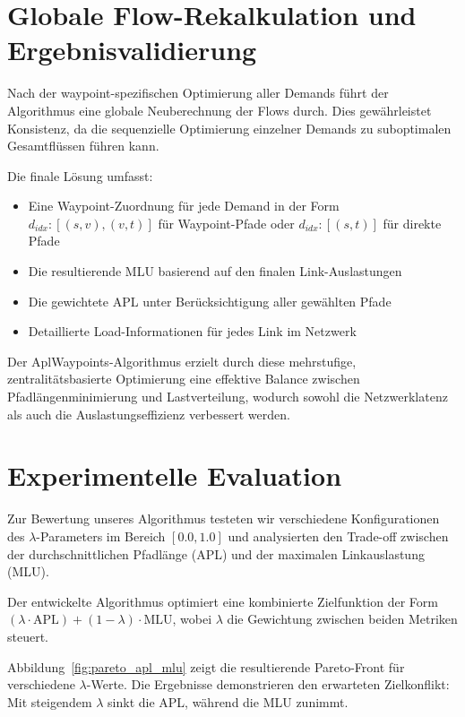 \section{Globale Flow-Rekalkulation und Ergebnisvalidierung}

Nach der waypoint-spezifischen Optimierung aller Demands führt der Algorithmus eine globale Neuberechnung der Flows durch. Dies gewährleistet Konsistenz, da die sequenzielle Optimierung einzelner Demands zu suboptimalen Gesamtflüssen führen kann.

Die finale Lösung umfasst:
\begin{itemize}
    \item Eine Waypoint-Zuordnung für jede Demand in der Form ${d_{idx}: [(s,v), (v,t)]}$ für Waypoint-Pfade oder ${d_{idx}: [(s,t)]}$ für direkte Pfade
    \item Die resultierende MLU basierend auf den finalen Link-Auslastungen
    \item Die gewichtete APL unter Berücksichtigung aller gewählten Pfade
    \item Detaillierte Load-Informationen für jedes Link im Netzwerk
\end{itemize}

Der AplWaypoints-Algorithmus erzielt durch diese mehrstufige, zentralitätsbasierte Optimierung eine effektive Balance zwischen Pfadlängenminimierung und Lastverteilung, wodurch sowohl die Netzwerklatenz als auch die Auslastungseffizienz verbessert werden.

\section{Experimentelle Evaluation}
\label{sec:evaluation}

Zur Bewertung unseres Algorithmus testeten wir verschiedene Konfigurationen des $\lambda$-Parameters im Bereich $[0.0, 1.0]$ und analysierten den Trade-off zwischen der durchschnittlichen Pfadlänge (APL) und der maximalen Linkauslastung (MLU). 

Der entwickelte Algorithmus optimiert eine kombinierte Zielfunktion der Form $(\lambda \cdot \text{APL}) + (1-\lambda) \cdot \text{MLU}$, wobei $\lambda$ die Gewichtung zwischen beiden Metriken steuert. 

Abbildung~\ref{fig:pareto_apl_mlu} zeigt die resultierende Pareto-Front für verschiedene $\lambda$-Werte. Die Ergebnisse demonstrieren den erwarteten Zielkonflikt: Mit steigendem $\lambda$ sinkt die APL, während die MLU zunimmt.

